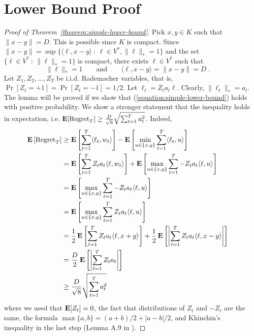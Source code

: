 \section{Lower Bound Proof}
\label{section:lower-bound-proof}

\begin{proof}[Proof of Theorem~\ref{theorem:simple-lower-bound}]
Pick $x,y \in K$ such that $\|x - y\| = D$. This is possible since $K$ is compact.
Since $\|x - y\| = \sup \{\langle \ell, x - y \rangle ~:~ \ell \in V^*, \|\ell\|_* = 1\}$
and the set $\{ \ell \in V^* ~:~ \|\ell\|_* = 1 \}$ is compact, there exists $\ell \in V^*$
such that
$$
\|\ell\|_* = 1 \qquad \text{and} \qquad \langle \ell, x - y \rangle = \|x - y\| = D \; .
$$
Let $Z_1, Z_2, \dots, Z_T$ be i.i.d. Rademacher variables, that is,
$\Pr[Z_t = +1] = \Pr[Z_t = -1] = 1/2$. Let $\ell_t = Z_t a_t \ell$.
Clearly, $\|\ell_t\|_* = a_t$. The lemma will be proved if we show that
(\ref{equation:simple-lower-bound}) holds with positive probability.
We show a stronger statement that the inequality holds in expectation, i.e.
$\operatorname*{\mathbf{E}}[\operatorname{Regret}_T] \ge \frac{D}{\sqrt{8}} \sqrt{\sum_{t=1}^T a_t^2}$. Indeed,
\begin{align*}
\operatorname*{\mathbf{E}}\left[ \operatorname{Regret}_T \right]
& \ge \operatorname*{\mathbf{E}}\left[ \sum_{t=1}^T \langle \ell_t, w_t \rangle \right] - \operatorname*{\mathbf{E}}\left[\min_{u \in \{x,y\}} \sum_{t=1}^T \langle \ell_t, u \rangle \right] \\
& = \operatorname*{\mathbf{E}}\left[ \sum_{t=1}^T Z_t a_t \langle \ell, w_t \rangle \right] + \operatorname*{\mathbf{E}} \left[\max_{u \in \{x,y\}} \sum_{t=1}^T -Z_t a_t \langle \ell, u \rangle \right]  \\
& = \operatorname*{\mathbf{E}}\left[ \max_{u \in \{x,y\}} \sum_{t=1}^T -Z_t a_t \langle \ell, u \rangle \right] \\
& = \operatorname*{\mathbf{E}}\left[ \max_{u \in \{x,y\}} \sum_{t=1}^T Z_t a_t \langle \ell, u \rangle \right]  \\
& = \frac{1}{2} \operatorname*{\mathbf{E}}\left[ \sum_{t=1}^T Z_t a_t \langle \ell, x + y \rangle \right]  + \frac{1}{2}\operatorname*{\mathbf{E}}\left[ \left|\sum_{t=1}^T Z_t a_t \langle \ell, x - y \rangle \right| \right] \\
& = \frac{D}{2}\operatorname*{\mathbf{E}}\left[ \left|\sum_{t=1}^T Z_t a_t \right| \right] \\
& \ge \frac{D}{\sqrt{8}} \sqrt{\sum_{t=1}^T a_t^2}
\end{align*}
where we used that $\operatorname*{\mathbf{E}}[Z_t] = 0$, the fact that distributions of $Z_t$ and
$-Z_t$ are the same, the formula $\max\{a,b\} = (a+b)/2 + |a-b|/2$, and
Khinchin's inequality in the last step (Lemma A.9 in
\cite{Cesa-Bianchi-Lugosi-2006}).
\end{proof}
